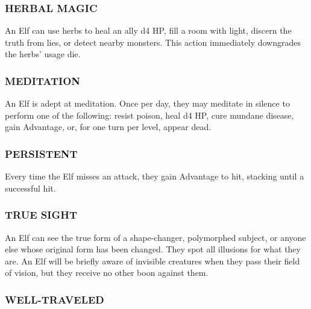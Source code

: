 \documentclass[twoside]{article}
\begin{document}
\subsubsection*{\footnotesize{H}\scriptsize{ERBAL} \footnotesize{M}\scriptsize{AGIC}\normalsize}

An Elf can use herbs to heal an ally d4 HP, fill a room with light, discern the truth from lies, or detect nearby monsters. This action immediately downgrades the herbs' usage die.

\subsubsection*{\footnotesize{M}\scriptsize{EDITATION}\normalsize}

An Elf is adept at meditation. Once per day, they may meditate in silence to perform one of the following: resist poison, heal d4 HP, cure mundane disease, gain Advantage, or, for one turn per level, appear dead.

\subsubsection*{\footnotesize{P}\scriptsize{ERSISTENT}\normalsize}

Every time the Elf misses an attack, they gain Advantage to hit, stacking until a successful hit.

\subsubsection*{\footnotesize{T}\scriptsize{RUE} \footnotesize{S}\scriptsize{IGHT}\normalsize}

An Elf can see the true form of a shape-changer, polymorphed subject, or anyone else whose original form has been changed. They spot all illusions for what they are. An Elf will be briefly aware of invisible creatures when they pass their field of vision, but they receive no other boon against them.

\subsubsection*{\footnotesize{W}\scriptsize{ELL-}\footnotesize{T}\scriptsize{RAVELED}\normalsize}
\end{document}
